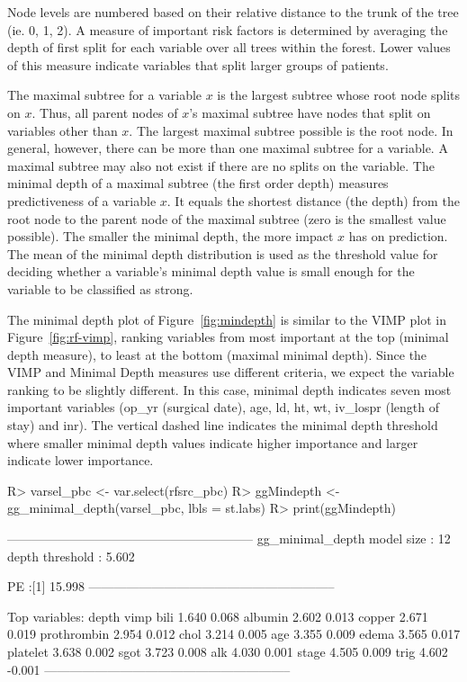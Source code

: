 \documentclass[nojss]{jss}
\begin{document}
Node levels are numbered based on their relative distance to the trunk of the tree (ie. 0, 1, 2). A measure of important risk factors is determined by averaging the depth of first split for each variable over all trees within the forest. Lower values of this measure indicate variables that split larger groups of patients. 

The maximal subtree for a variable $x$ is the largest subtree whose root node splits on $x$. Thus, all parent nodes of $x$'s maximal subtree have nodes that split on variables other than $x$. The largest maximal subtree possible is the root node. In general, however, there can be more than one maximal subtree for a variable. A maximal subtree may also not exist if there are no splits on the variable. The minimal depth of a maximal subtree (the first order depth) measures predictiveness of a variable $x$. It equals the shortest distance (the depth) from the root node to the parent node of the maximal subtree (zero is the smallest value possible). The smaller the minimal depth, the more impact $x$ has on prediction. The mean of the minimal depth distribution is used as the threshold value for deciding whether a variable's minimal depth value is small enough for the variable to be classified as strong. 

The minimal depth plot of Figure~\ref{fig:mindepth} is similar to the VIMP plot in Figure~\ref{fig:rf-vimp}, ranking variables from most important at the top (minimal depth measure), to least at the bottom (maximal minimal depth). Since the VIMP and Minimal Depth measures use different criteria, we expect the variable ranking to be slightly different. In this case, minimal depth indicates seven most important variables (op\_yr (surgical date), age, ld, ht, wt, iv\_lospr (length of stay) and inr). The vertical dashed line indicates the minimal depth threshold where smaller minimal depth values indicate higher importance and larger indicate lower importance.


\begin{Schunk}
\begin{Sinput}
R> varsel_pbc <- var.select(rfsrc_pbc)
R> ggMindepth <- gg_minimal_depth(varsel_pbc, lbls = st.labs)
R> print(ggMindepth)
\end{Sinput}
\end{Schunk}

\begin{Schunk}
\begin{Soutput}
-----------------------------------------------------------
gg_minimal_depth
model size         : 12 
depth threshold    : 5.602 

PE :[1] 15.998
-----------------------------------------------------------

Top variables:
            depth   vimp
bili        1.640  0.068
albumin     2.602  0.013
copper      2.671  0.019
prothrombin 2.954  0.012
chol        3.214  0.005
age         3.355  0.009
edema       3.565  0.017
platelet    3.638  0.002
sgot        3.723  0.008
alk         4.030  0.001
stage       4.505  0.009
trig        4.602 -0.001
-----------------------------------------------------------
\end{Soutput}
\end{Schunk}
\end{document}
